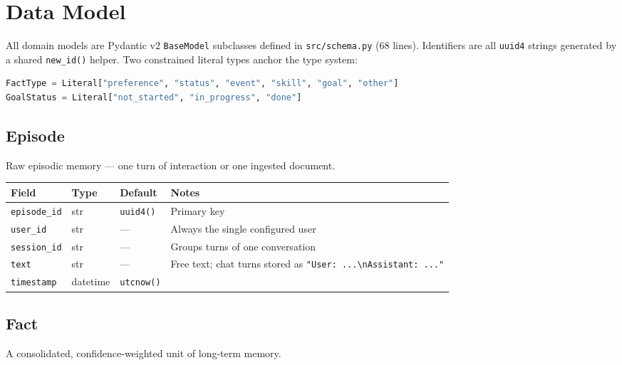 \documentclass[11pt,a4paper]{report}
\newcommand{\code}[1]{\texttt{\small #1}}
\newcommand{\file}[1]{\texttt{\small\color{accent!70!black}#1}}
\begin{document}
\chapter{Data Model}

All domain models are Pydantic v2 \code{BaseModel} subclasses defined in \file{src/schema.py} (68 lines). Identifiers are all \code{uuid4} strings generated by a shared \code{new\_id()} helper. Two constrained literal types anchor the type system:

\begin{lstlisting}[language=Python,caption={Core literal types (schema.py)}]
FactType = Literal["preference", "status", "event", "skill", "goal", "other"]
GoalStatus = Literal["not_started", "in_progress", "done"]
\end{lstlisting}

\section{Episode}
Raw episodic memory — one turn of interaction or one ingested document.

\begin{longtable}{lll L{6cm}}
\toprule
\textbf{Field} & \textbf{Type} & \textbf{Default} & \textbf{Notes} \\
\midrule
\endhead
\code{episode\_id} & str & \code{uuid4()} & Primary key \\
\code{user\_id} & str & --- & Always the single configured user \\
\code{session\_id} & str & --- & Groups turns of one conversation \\
\code{text} & str & --- & Free text; chat turns stored as \code{"User: ...\textbackslash nAssistant: ..."} \\
\code{timestamp} & datetime & \code{utcnow()} & \\
\bottomrule
\end{longtable}

\section{Fact}
A consolidated, confidence-weighted unit of long-term memory.
\end{document}
